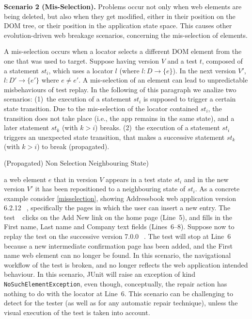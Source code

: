 \noindent
\textbf{Scenario 2 (Mis-Selection).} 
Problems occur not only when web elements are being deleted, but also when they get modified, either in their position on the DOM tree, or their position in the application state space. This causes other evolution-driven web breakage scenarios, concerning the mis-selection of elements. 

A mis-selection occurs when a locator selects a different DOM element from the one that was used to target. Suppose having version $V$ and a test $t$, composed of a statement $st_i$, which uses a locator $l$ (where $l: D \rightarrow \{e\}$).
In the next version $V'$, $l: D' \rightarrow \{e'\}$ where $e \ne e'$.
A mis-selection of an element can lead to unpredictable misbehaviours of test replay. In the following of this paragraph we analize two scenarios: (1)~the execution of a statement $st_i$ is supposed to trigger a certain state transition. Due to the mis-selection of the locator contained $st_i$, the transition does not take place (i.e., the app remains in the same state), and a later statement $st_k$ (with $k>i$) breaks.
(2)~the execution of a statement $st_i$ triggers an unexpected state transition, that makes a successive statement $st_k$ (with $k>i$) to break (propagated).

 (Propagated) Non Selection Neighbouring State)



a web element $e$ that in version $V$ appears in a test state $st_i$ and in the new version $V'$ it has been repositioned to a neighbouring state of $st_i$. 
As a concrete example consider \autoref{misselection}, showing Addressbook web application version 6.2.12~\textcircled{}, specifically the pages in which the user can insert a new entry. The test~\textcircled{} clicks on the Add New link on the home page (Line~5), and fills in the First name, Last name and Company text fields (Lines~6--8).
Suppose now to replay the test on the successive version 7.0.0~\textcircled{}. The test will stop at Line~6 because a new intermediate confirmation page has been added, and the First name web element can no longer be found. In this scenario, the navigational workflow of the test is broken, and no longer reflects the web application intended behaviour.
In this scenario, JUnit will raise an exception of kind \texttt{NoSuchElementException}, even though, conceptually, the repair action has nothing to do with the locator at Line~6. 
This scenario can be challenging to detect for the tester (as well as for any automatic repair technique), unless the visual execution of the test is taken into account.

